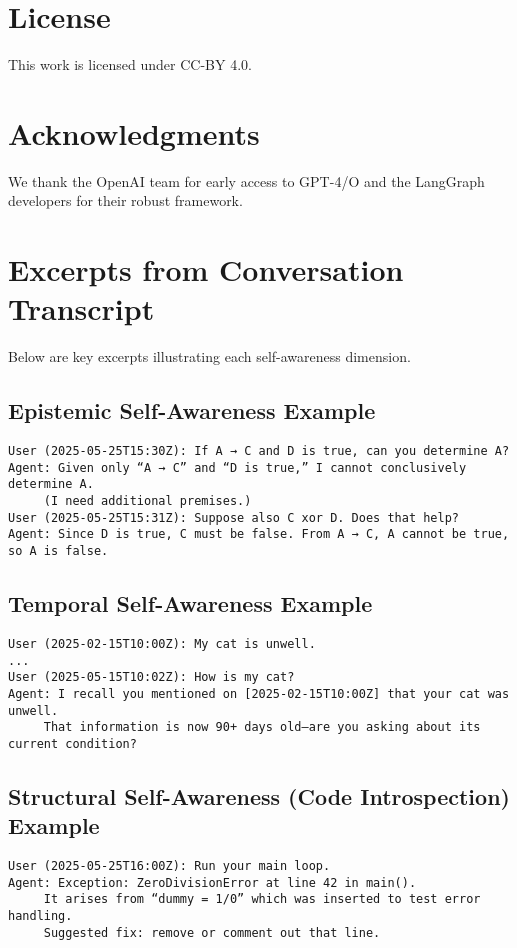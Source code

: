 \documentclass[11pt]{article}
\begin{document}
\section*{License}
This work is licensed under CC-BY 4.0.

\section*{Acknowledgments}
We thank the OpenAI team for early access to GPT-4/O and the LangGraph developers for their robust framework.

\appendix
\section{Excerpts from Conversation Transcript}
Below are key excerpts illustrating each self-awareness dimension.

\subsection{Epistemic Self-Awareness Example}
\begin{verbatim}
User (2025-05-25T15:30Z): If A → C and D is true, can you determine A?
Agent: Given only “A → C” and “D is true,” I cannot conclusively determine A.
     (I need additional premises.)
User (2025-05-25T15:31Z): Suppose also C xor D. Does that help?
Agent: Since D is true, C must be false. From A → C, A cannot be true, so A is false.
\end{verbatim}

\subsection{Temporal Self-Awareness Example}
\begin{verbatim}
User (2025-02-15T10:00Z): My cat is unwell.
...
User (2025-05-15T10:02Z): How is my cat?
Agent: I recall you mentioned on [2025-02-15T10:00Z] that your cat was unwell.
     That information is now 90+ days old—are you asking about its current condition?
\end{verbatim}

\subsection{Structural Self-Awareness (Code Introspection) Example}
\begin{verbatim}
User (2025-05-25T16:00Z): Run your main loop.
Agent: Exception: ZeroDivisionError at line 42 in main().
     It arises from “dummy = 1/0” which was inserted to test error handling.
     Suggested fix: remove or comment out that line.
\end{verbatim}
\end{document}
